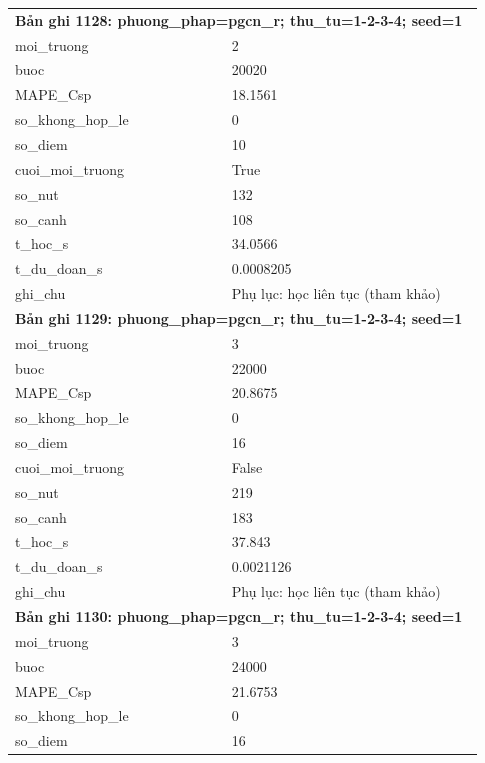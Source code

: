 \begin{longtable}{p{0.43\linewidth}p{0.50\linewidth}}
\midrule
\multicolumn{2}{p{0.95\linewidth}}{\textbf{Bản ghi 1128: phuong\_phap=pgcn\_r; thu\_tu=1-2-3-4; seed=1}} \\
moi\_\allowbreak truong & 2 \\
buoc & 20020 \\
MAPE\_\allowbreak Csp & 18.1561 \\
so\_\allowbreak khong\_\allowbreak hop\_\allowbreak le & 0 \\
so\_\allowbreak diem & 10 \\
cuoi\_\allowbreak moi\_\allowbreak truong & True \\
so\_\allowbreak nut & 132 \\
so\_\allowbreak canh & 108 \\
t\_\allowbreak hoc\_\allowbreak s & 34.0566 \\
t\_\allowbreak du\_\allowbreak doan\_\allowbreak s & 0.0008205 \\
ghi\_\allowbreak chu & Phụ lục: học liên tục (tham khảo) \\
\midrule
\multicolumn{2}{p{0.95\linewidth}}{\textbf{Bản ghi 1129: phuong\_phap=pgcn\_r; thu\_tu=1-2-3-4; seed=1}} \\
moi\_\allowbreak truong & 3 \\
buoc & 22000 \\
MAPE\_\allowbreak Csp & 20.8675 \\
so\_\allowbreak khong\_\allowbreak hop\_\allowbreak le & 0 \\
so\_\allowbreak diem & 16 \\
cuoi\_\allowbreak moi\_\allowbreak truong & False \\
so\_\allowbreak nut & 219 \\
so\_\allowbreak canh & 183 \\
t\_\allowbreak hoc\_\allowbreak s & 37.843 \\
t\_\allowbreak du\_\allowbreak doan\_\allowbreak s & 0.0021126 \\
ghi\_\allowbreak chu & Phụ lục: học liên tục (tham khảo) \\
\midrule
\multicolumn{2}{p{0.95\linewidth}}{\textbf{Bản ghi 1130: phuong\_phap=pgcn\_r; thu\_tu=1-2-3-4; seed=1}} \\
moi\_\allowbreak truong & 3 \\
buoc & 24000 \\
MAPE\_\allowbreak Csp & 21.6753 \\
so\_\allowbreak khong\_\allowbreak hop\_\allowbreak le & 0 \\
so\_\allowbreak diem & 16 \\

\end{longtable}
